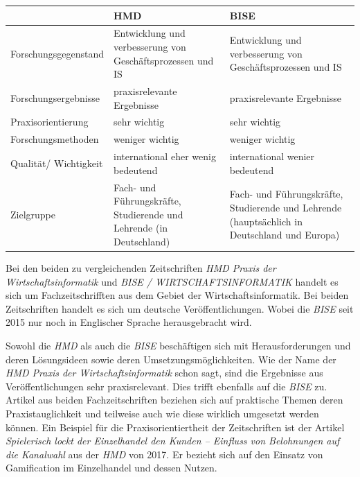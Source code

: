 \documentclass[12pt,utf8]{scrartcl}
\begin{document}
\begin{flushleft}
\begin{tabular}{|p{4cm}|p{5.5cm}|p{5.5cm}|}
\hline
& HMD & BISE \\
\hline
Forschungsgegenstand & Entwicklung und verbesserung von Geschäftsprozessen und IS & Entwicklung und verbesserung von Geschäftsprozessen und IS \\
\hline
Forschungsergebnisse & praxisrelevante Ergebnisse & praxisrelevante Ergebnisse \\
\hline
Praxisorientierung & sehr wichtig & sehr wichtig \\
\hline
Forschungsmethoden & weniger wichtig & weniger wichtig \\
\hline
Qualität/ Wichtigkeit & international eher wenig bedeutend & international wenier bedeutend \\
\hline
Zielgruppe & Fach- und Führungskräfte, Studierende und Lehrende (in Deutschland) & Fach- und Führungskräfte, Studierende und Lehrende (hauptsächlich in Deutschland und Europa) \\
\hline
\end{tabular}
\newline
\newline
\newline

Bei den beiden zu vergleichenden Zeitschriften \emph{HMD Praxis der Wirtschaftsinformatik} und \emph{BISE / WIRTSCHAFTSINFORMATIK} handelt es sich um Fachzeitschrifften aus dem Gebiet der Wirtschaftsinformatik. Bei beiden Zeitschriften handelt es sich um deutsche Veröffentlichungen. Wobei die \emph{BISE} seit 2015 nur noch in Englischer Sprache herausgebracht wird\cite{BISE}.

Sowohl die \emph{HMD} als auch die \emph{BISE} beschäftigen sich mit Herausforderungen und deren Lösungsideen sowie deren Umsetzungsmöglichkeiten\cite{Meier2017}\cite{Stein2017}\cite{Ebert2017}. Wie der Name der \emph{HMD Praxis der Wirtschaftsinformatik} schon sagt, sind die Ergebnisse aus Veröffentlichungen sehr praxisrelevant. Dies trifft ebenfalls auf die \emph{BISE} zu. Artikel aus beiden Fachzeitschriften beziehen sich auf praktische Themen deren Praxistauglichkeit und teilweise auch wie diese wirklich umgesetzt werden können\cite{Meier2017}\cite{Stein2017}\cite{Ebert2017}\cite{Kakar2017}. Ein Beispiel für die Praxisorientiertheit der Zeitschriften ist der Artikel \emph{Spielerisch lockt der Einzelhandel den Kunden – Einfluss von Belohnungen auf die Kanalwahl}\cite{Stein2017} aus der \emph{HMD} von 2017. Er bezieht sich auf den Einsatz von Gamification im Einzelhandel und dessen Nutzen. 


\end{flushleft}
\end{document}
